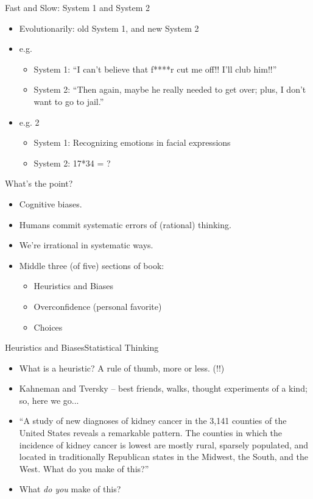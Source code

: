 \documentclass{beamer}
\begin{document}
\begin{frame}{Fast and Slow: System 1 and System 2}
\begin{itemize}
\addtolength{\itemsep}{0.5\baselineskip}
\item Evolutionarily: old System 1, and new System 2
\item e.g.
    \begin{itemize}
    \addtolength{\itemsep}{0.5\baselineskip}
    \item System 1: ``I can't believe that f****r cut me off!! I'll club him!!''
    \item System 2: ``Then again, maybe he really needed to get over; plus, I don't want to go to jail.''
    \end{itemize}
\item e.g. 2
    \begin{itemize}
    \addtolength{\itemsep}{0.5\baselineskip}
    \item System 1: Recognizing emotions in facial expressions
    \item System 2: 17*34 = ?
    \end{itemize}
\end{itemize}
\end{frame}

\begin{frame}{What's the point?}{}
\begin{itemize}
\addtolength{\itemsep}{0.5\baselineskip}
\item Cognitive biases.
\item Humans commit systematic errors of (rational) thinking.
\item We're irrational in systematic ways.
\item Middle three (of five) sections of book:
    \begin{itemize}
    \addtolength{\itemsep}{0.5\baselineskip}
    \item Heuristics and Biases
    \item Overconfidence (personal favorite)
    \item Choices
    \end{itemize}
\end{itemize}
\end{frame}

\begin{frame}{Heuristics and Biases}{Statistical Thinking}
\begin{itemize}
\addtolength{\itemsep}{0.5\baselineskip}
\item What is a heuristic? A rule of thumb, more or less. (!!)
\item Kahneman and Tversky -- best friends, walks, thought experiments of a kind; so, here we go...
\item ``A study of new diagnoses of kidney cancer in the 3,141 counties of the United States reveals a remarkable pattern. The counties in which the incidence of kidney cancer is lowest are mostly rural, sparsely populated, and located in traditionally Republican states in the Midwest, the South, and the West. What do you make of this?''
\item What {\it do you} make of this?
\end{itemize}
\end{frame}
\end{document}
